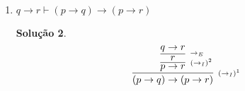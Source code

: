 \documentclass[11pt,a4paper]{report}
\newtheorem*{Solucao}{Solu\c{c}\~ao}
\begin{document}
\begin{enumerate}
\begin{enumerate}
\begin{Solucao}
                    \[
                    \infer[\scriptstyle{(\to_I)}^1]
                             {(p \lor r ) \to (q \lor s)}
                             {
                               \infer[\scriptstyle{(\lor_E)}^2]
                                        {q \lor s}
                                        {
                                          p\lor r^1 
                                          &
                                          \infer[\scriptstyle{\lor_{IE}}]
                                                   {q \lor s}
                                                   {
                                                     \infer[\scriptstyle{\to_E}]
                                                              {q}
                                                              {p \to q
                                                              & p^2}
                                                   }
                                          &
                                          \infer[\scriptstyle{\lor_{ID}}]
                                                  {q\lor s}
                                                  {
                                                    \infer[\scriptstyle{\to_E}]
                                                             {s}
                                                             {
                                                               r \to s
                                                               & r^2
                                                             }
                                                  }
                                        }
                             }
                    \]
                  \end{Solucao}
		\item $q\rightarrow r\vdash (p\rightarrow
                  q)\rightarrow(p\rightarrow r)$
                  \begin{Solucao}
                    \verb| |\\
                  \[
                    \infer[\scriptstyle{(\to_I)^1}]
                             {(p \to q)\to (p \to r)}
                             {
                               \infer[\scriptstyle{(\to_I)}^2]
                                        {p \to r}
                                        {
                                          \infer[\scriptstyle{\to_E}]
                                                   {r}
                                                   {
                                                     q \to r 
}}}\]
\end{Solucao}
\end{enumerate}
\end{enumerate}
\end{document}
